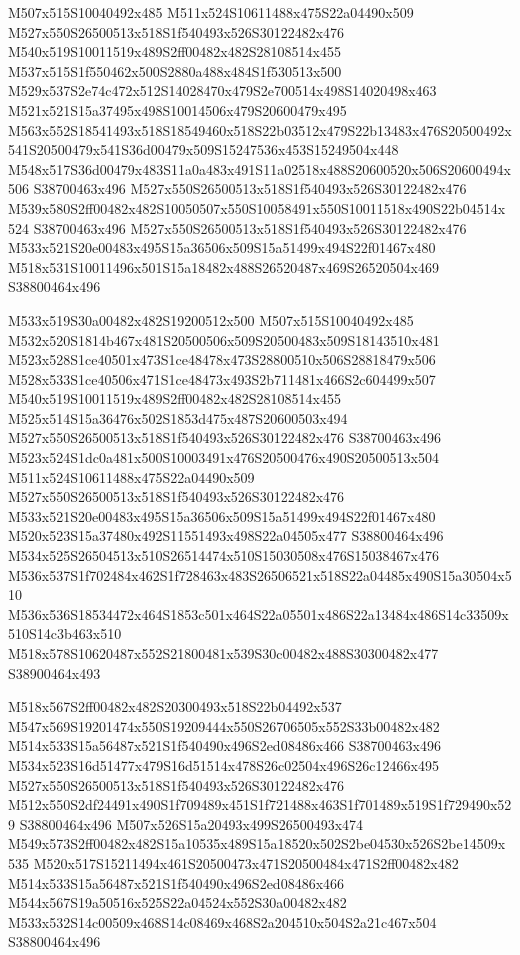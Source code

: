 \documentclass{article}
\begin{document}
\begin{multicols}{2}
M507x515S10040492x485 M511x524S10611488x475S22a04490x509 M527x550S26500513x518S1f540493x526S30122482x476 M540x519S10011519x489S2ff00482x482S28108514x455 M537x515S1f550462x500S2880a488x484S1f530513x500 M529x537S2e74c472x512S14028470x479S2e700514x498S14020498x463 M521x521S15a37495x498S10014506x479S20600479x495 M563x552S18541493x518S18549460x518S22b03512x479S22b13483x476S20500492x541S20500479x541S36d00479x509S15247536x453S15249504x448 M548x517S36d00479x483S11a0a483x491S11a02518x488S20600520x506S20600494x506 S38700463x496 M527x550S26500513x518S1f540493x526S30122482x476 M539x580S2ff00482x482S10050507x550S10058491x550S10011518x490S22b04514x524 S38700463x496 M527x550S26500513x518S1f540493x526S30122482x476 M533x521S20e00483x495S15a36506x509S15a51499x494S22f01467x480 M518x531S10011496x501S15a18482x488S26520487x469S26520504x469 S38800464x496

M533x519S30a00482x482S19200512x500 M507x515S10040492x485 M532x520S1814b467x481S20500506x509S20500483x509S18143510x481 M523x528S1ce40501x473S1ce48478x473S28800510x506S28818479x506 M528x533S1ce40506x471S1ce48473x493S2b711481x466S2c604499x507 M540x519S10011519x489S2ff00482x482S28108514x455 M525x514S15a36476x502S1853d475x487S20600503x494 M527x550S26500513x518S1f540493x526S30122482x476 S38700463x496 M523x524S1dc0a481x500S10003491x476S20500476x490S20500513x504 M511x524S10611488x475S22a04490x509 M527x550S26500513x518S1f540493x526S30122482x476 M533x521S20e00483x495S15a36506x509S15a51499x494S22f01467x480 M520x523S15a37480x492S11551493x498S22a04505x477 S38800464x496 M534x525S26504513x510S26514474x510S15030508x476S15038467x476 M536x537S1f702484x462S1f728463x483S26506521x518S22a04485x490S15a30504x510 M536x536S18534472x464S1853c501x464S22a05501x486S22a13484x486S14c33509x510S14c3b463x510 M518x578S10620487x552S21800481x539S30c00482x488S30300482x477 S38900464x493

M518x567S2ff00482x482S20300493x518S22b04492x537 M547x569S19201474x550S19209444x550S26706505x552S33b00482x482 M514x533S15a56487x521S1f540490x496S2ed08486x466 S38700463x496 M534x523S16d51477x479S16d51514x478S26c02504x496S26c12466x495 M527x550S26500513x518S1f540493x526S30122482x476 M512x550S2df24491x490S1f709489x451S1f721488x463S1f701489x519S1f729490x529 S38800464x496 M507x526S15a20493x499S26500493x474 M549x573S2ff00482x482S15a10535x489S15a18520x502S2be04530x526S2be14509x535 M520x517S15211494x461S20500473x471S20500484x471S2ff00482x482 M514x533S15a56487x521S1f540490x496S2ed08486x466 M544x567S19a50516x525S22a04524x552S30a00482x482 M533x532S14c00509x468S14c08469x468S2a204510x504S2a21c467x504 S38800464x496


\end{multicols}
\end{document}
